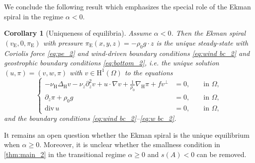 \documentclass[preprint]{elsarticle}
\newtheorem{cor}[cor]{Corollary}
\numberwithin{equation}{section}
\newcommand {\R}	{\mathbb{R}}
\newcommand {\T}	{\mathbb{T}}
\DeclareMathOperator{\divH}{div_{\H}}
\renewcommand{\H}{\mathrm{H}}
\newcommand{\nablaH}{\nabla_{\H}}
\newcommand{\DeltaH}{\Delta_{\H}}
\newcommand{\rC}{\mathrm{C}}
\newcommand{\rH}{\H}
\newcommand{\rE}{\mathrm{E}}
\renewcommand{\div}{\mathrm{div} \,}
\begin{document}
%

We conclude the following result which emphasizes the special role of the Ekman spiral in the regime $\alpha < 0$.

\begin{cor}[Uniqueness of equilibria]\label{cor:unique_2}
	Assume $\alpha < 0$. Then the Ekman spiral $(v_{\rE},0,\pi_{\rE})$ with pressure $\pi_{\rE}(x,y,z) = - \rho_0 g \cdot z$ is the unique steady-state with Coriolis force \eqref{eq:pe_2} and wind-driven boundary conditions \eqref{eq:wind bc_2} and geostrophic boundary conditions \eqref{eq:bottom_2}, i.e. the unique solution $(u,\pi)=(v,w,\pi)$ with $v \in \rH^1(\Omega)$ to the equations
	\begin{equation}
		\left\{
		\begin{aligned}
			- \nu_{\rH} \DeltaH v - \nu_z \partial_z^2 v + u \cdot \nabla v + \frac{1}{\rho_0}\nablaH \pi + f v^\perp &= 0, &&\text{ in } \Omega, \\ %
			\partial_z \pi+ \rho_0 g &= 0, &&\text{ in } \Omega, \\ %
			\div u &= 0, &&\text{ in } \Omega, 
		\end{aligned}
		\right. 
		\label{eq:equilibrium_2}
	\end{equation}
	and the boundary conditions \eqref{eq:wind bc_2}--\eqref{eq:w bc_2}.
\end{cor}
It remains an open question whether the Ekman spiral is the unique equilibrium when $\alpha \geq 0$. Moreover, it is unclear whether the smallness condition in \autoref{thm:main_2} in the transitional regime $\alpha \geq 0$ and $s(A) < 0$ can be removed.
\end{document}
